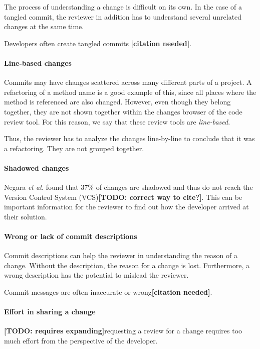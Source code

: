 \documentclass[conference,a4paper]{IEEEtran}
\newcommand{\citeneeded}{\textbf{{[}citation needed{]}}}
\begin{document}
The process of understanding a change is difficult on its own. In the
case of a tangled commit, the reviewer in addition has to understand
several unrelated changes at the same time.

Developers often create tangled commits \citeneeded{}.

\paragraph{Line-based changes}

Commits may have changes scattered across many different parts of a
project. A refactoring of a method name is a good example of this,
since all places where the method is referenced are also
changed. However, even though they belong together, they are not shown
together within the changes browser of the code review tool. For this
reason, we say that these review tools are \textit{line-based}.

Thus, the reviewer has to analyze the changes line-by-line to conclude
that it was a refactoring. They are not grouped together.

\paragraph{Shadowed changes}

Negara \textit{et al.} found that 37\% of changes are shadowed and
thus do not reach the Version Control System
(VCS)\cite{Nega12a}\textbf{{[}TODO: correct way to cite?{]}}. This can
be important information for the reviewer to find out how the
developer arrived at their solution.

\paragraph{Wrong or lack of commit descriptions}

Commit descriptions can help the reviewer in understanding the reason
of a change. Without the description, the reason for a change is
lost. Furthermore, a wrong description has the potential to mislead
the reviewer.

Commit messages are often inaccurate or wrong\citeneeded{}.

\paragraph{Effort in sharing a change}

\textbf{{[}TODO: requires expanding{]}}requesting a review for a change requires too much effort from
  the perspective of the developer.
\end{document}
